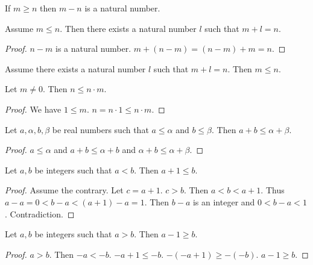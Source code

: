 \documentclass{article}
\begin{document}
\begin{forthel}
\begin{lemma}
If $m \geq n$ then $m-n$ is a natural number.
\end{lemma}

\begin{lemma}
Assume $m \leq n$. Then
there exists a natural number $l$ such that $m + l = n$.
\end{lemma}
\begin{proof}
$n - m$ is a natural number. $m + (n-m) = (n - m) + m = n$.
\end{proof}

\begin{lemma}
Assume there exists a natural number $l$ such
that $m + l = n$. Then $m \leq n$.
\end{lemma}

\begin{lemma}
Let $m \neq 0$. Then $n \leq n \cdot m$.
\end{lemma}
\begin{proof}
We have $1 \leq m$. $n = n \cdot 1 \leq n \cdot m$.
\end{proof}

\begin{lemma}
Let $a,\alpha,b,\beta$ be real numbers such that $a \leq \alpha$ and $b \leq \beta$.
Then $a + b \leq \alpha + \beta$.
\end{lemma}
\begin{proof}
$a \leq \alpha$ and $a + b \leq \alpha + b$ and $\alpha + b \leq \alpha + \beta$.
\end{proof}

\begin{lemma}
Let $a,b$ be integers such that $a < b$.
Then $a + 1 \leq b$.
\end{lemma}
\begin{proof}
Assume the contrary. Let $c = a+1$. $c>b$.
Then $a < b < a + 1$. Thus $a - a = 0 < b - a < (a + 1) - a = 1$. Then $b - a$ is an integer
and $0 < b - a < 1$. Contradiction.
\end{proof}

\begin{lemma}
Let $a,b$ be integers such that $a > b$.
Then $a - 1 \geq b$.
\end{lemma}
\begin{proof}
$a > b$. Then $-a < -b$. $-a + 1 \leq -b$. $-(-a + 1) \geq -(-b)$. $a - 1 \geq b$.
\end{proof}
\end{forthel}
\end{document}
